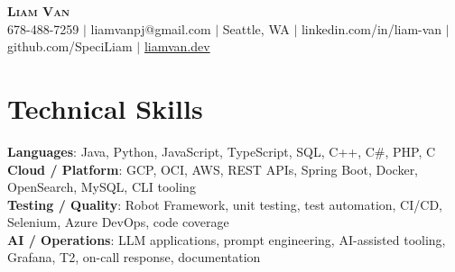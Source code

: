 \documentclass[letterpaper,11pt]{article}
\begin{document}

%
\begin{center}
    \textbf{\Huge \scshape Liam Van} \\ \vspace{1pt}
    \small 678-488-7259 $|$ \small {liamvanpj@gmail.com} $|$ Seattle, WA
 {{$|$ linkedin.com/in/liam-van} {$|$ github.com/SpeciLiam} {$|$ \href{https://liamvan.dev}{liamvan.dev}}}

\end{center}

\section{Technical Skills}
 \begin{itemize}[leftmargin=0.15in, label={}]
    \small{\item{
     \textbf{Languages}{: Java, Python, JavaScript, TypeScript, SQL, C++, C\#, PHP, C} \\
     \textbf{Cloud / Platform}{: GCP, OCI, AWS, REST APIs, Spring Boot, Docker, OpenSearch, MySQL, CLI tooling} \\
     \textbf{Testing / Quality}{: Robot Framework, unit testing, test automation, CI/CD, Selenium, Azure DevOps, code coverage} \\
     \textbf{AI / Operations}{: LLM applications, prompt engineering, AI-assisted tooling, Grafana, T2, on-call response, documentation} \\
    }}
 \end{itemize}
%

\end{document}
